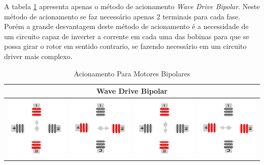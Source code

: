 A tabela \ref{Table:AcionamentoBipolar} apresenta apenas o método de acionamento \emph{Wave Drive Bipolar}. Neste método de acionamento se faz necessário apenas 2 terminais para cada fase. Porém a grande desvantagem deste método de acionamento é a necessidade de um circuito capaz de inverter a corrente em cada uma das bobinas para que se possa girar o rotor em sentido contrario, se fazendo necessário em um circuito driver mais complexo. 

\begin{table}[H]
	\centering
	\caption{Acionamento Para Motores Bipolares}
	\label{Table:AcionamentoBipolar}
	\begin{tabular}{|cccc|}
		\hline
		\multicolumn{4}{|c|}{Wave Drive Bipolar}  \\
		\hline
		\includegraphics[width = 0.15\columnwidth]{Images/AcionamentoDoHSM/Bipolar/WaveDrive/WaveDriveI.png} & \includegraphics[width = 0.15\columnwidth]{Images/AcionamentoDoHSM/Bipolar/WaveDrive/WaveDriveII.png} & \includegraphics[width = 0.15\columnwidth]{Images/AcionamentoDoHSM/Bipolar/WaveDrive/WaveDriveIII.png} & \includegraphics[width = 0.15\columnwidth]{Images/AcionamentoDoHSM/Bipolar/WaveDrive/WaveDriveIV.png} \\
		\hline
	\end{tabular}
\end{table} 

